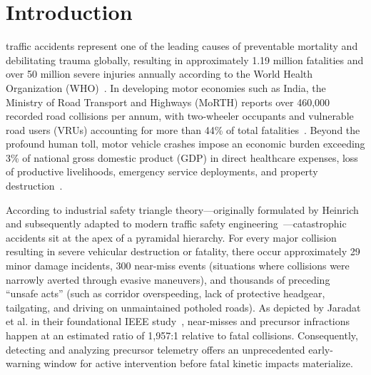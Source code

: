 \documentclass[journal,compsoc]{IEEEtran}
\begin{document}
\maketitle
\IEEEdisplaynontitleabstractindextext
\IEEEpeerreviewmaketitle

\section{Introduction}
 traffic accidents represent one of the leading causes of preventable mortality and debilitating trauma globally, resulting in approximately 1.19 million fatalities and over 50 million severe injuries annually according to the World Health Organization (WHO)~\cite{who2023}. In developing motor economies such as India, the Ministry of Road Transport and Highways (MoRTH) reports over 460,000 recorded road collisions per annum, with two-wheeler occupants and vulnerable road users (VRUs) accounting for more than 44\% of total fatalities~\cite{morth2023}. Beyond the profound human toll, motor vehicle crashes impose an economic burden exceeding 3\% of national gross domestic product (GDP) in direct healthcare expenses, loss of productive livelihoods, emergency service deployments, and property destruction~\cite{wang2021safety}.

According to industrial safety triangle theory---originally formulated by Heinrich and subsequently adapted to modern traffic safety engineering~\cite{heinrich1931, jonsson2021predictive}---catastrophic accidents sit at the apex of a pyramidal hierarchy. For every major collision resulting in severe vehicular destruction or fatality, there occur approximately 29 minor damage incidents, 300 near-miss events (situations where collisions were narrowly averted through evasive maneuvers), and thousands of preceding ``unsafe acts'' (such as corridor overspeeding, lack of protective headgear, tailgating, and driving on unmaintained potholed roads). As depicted by Jaradat et al. in their foundational IEEE study~\cite{jaradat2025leveraging}, near-misses and precursor infractions happen at an estimated ratio of 1,957:1 relative to fatal collisions. Consequently, detecting and analyzing precursor telemetry offers an unprecedented early-warning window for active intervention before fatal kinetic impacts materialize.
\end{document}
